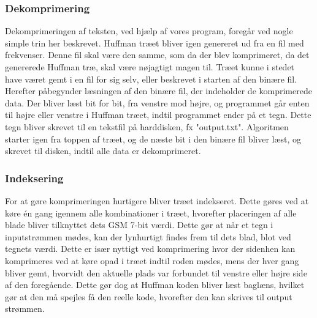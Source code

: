 \subsubsection{Dekomprimering}

Dekomprimeringen af teksten, ved hjælp af vores program, foregår ved nogle simple trin her beskrevet. Huffman træet bliver igen genereret ud fra en fil med frekvenser. Denne fil skal være den samme, som da der blev komprimeret, da det genererede Huffman træ, skal være nøjagtigt magen til. Træet kunne i stedet have været gemt i en fil for sig selv, eller beskrevet i starten af den binære fil.
Herefter påbegynder læsningen af den binære fil, der indeholder de komprimerede data. Der bliver læst bit for bit, fra venstre mod højre, og programmet går enten til højre eller venstre i Huffman træet, indtil programmet ender på et tegn. Dette tegn bliver skrevet til en tekstfil på harddisken, fx "output.txt". Algoritmen starter igen fra toppen af træet, og de næste bit i den binære fil bliver læst, og skrevet til disken, indtil alle data er dekomprimeret.

\subsubsection{Indeksering}
For at gøre komprimeringen hurtigere bliver træet indekseret. Dette gøres ved at køre én gang igennem alle kombinationer i træet, hvorefter placeringen af alle blade bliver tilknyttet dets GSM 7-bit værdi. Dette gør at når et tegn i inputstrømmen mødes, kan der lynhurtigt findes frem til dets blad, blot ved tegnets værdi. Dette er især nyttigt ved komprimering hvor der sidenhen kan komprimeres ved at køre opad i træet indtil roden mødes, mens der hver gang bliver gemt, hvorvidt den aktuelle plads var forbundet til venstre eller højre side af den foregående. Dette gør dog at Huffman koden bliver læst baglæns, hvilket gør at den må spejles få den reelle kode, hvorefter den kan skrives til output strømmen.